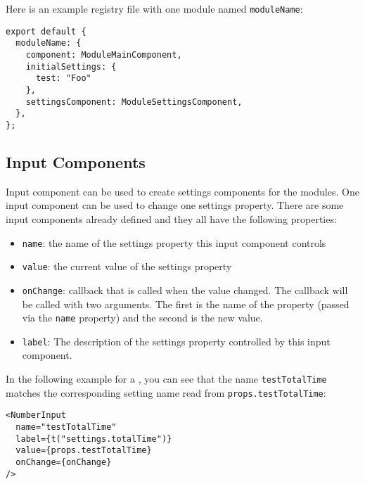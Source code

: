 Here is an example registry file with one module named \texttt{moduleName}:
\begin{verbatim}
export default {
  moduleName: {
    component: ModuleMainComponent,
    initialSettings: {
      test: "Foo"
    },
    settingsComponent: ModuleSettingsComponent,
  },
};
\end{verbatim}

\subsection{Input Components}
\label{sec:input-components}
Input component can be used to create settings components for the modules.
One input component can be used to change one settings property.
There are some input components already defined and they all have the following properties:
\begin{itemize}
  \item \texttt{name}: the name of the settings property this input component controls
  \item \texttt{value}: the current value of the settings property
  \item \texttt{onChange}: callback that is called when the value changed. 
    The callback will be called with two arguments.
    The first is the name of the property (passed via the \texttt{name} property) and the second is the new value.
  \item \texttt{label}: The description of the settings property controlled by this input component.
\end{itemize}

In the following example for a , you can see that the name \texttt{testTotalTime} matches the corresponding setting name read from \texttt{props.testTotalTime}:
\begin{verbatim}
<NumberInput
  name="testTotalTime"
  label={t("settings.totalTime")}
  value={props.testTotalTime}
  onChange={onChange}
/> 
\end{verbatim}

